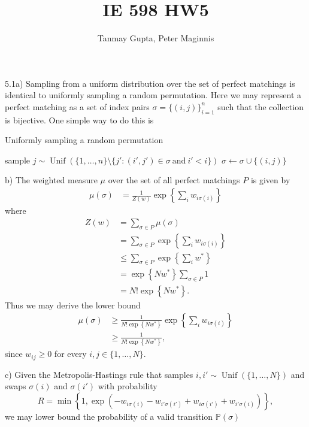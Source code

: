 \documentclass[10pt,onecolumn,letterpaper]{article}
\begin{document}
\title{IE 598 HW5}
\author{Tanmay Gupta, Peter Maginnis}
\maketitle

5.1a) Sampling from a uniform distribution over the set of perfect matchings is identical to uniformly sampling a random permutation.  Here we may represent a perfect matching as a set of index pairs $\sigma=\{(i,j)\}_{i=1}^n$ such that the collection is bijective.  One simple way to do this is
%
%
\begin{algorithm}
\raggedright
  \caption{Uniformly sampling a random permutation}
  \begin{algorithmic}
    \STATE sample $j\sim\operatorname{Unif}\left(\{1,\dotsc, n\}\setminus\{j':(i',j')\in\sigma\ \mathrm{ and }\ i'<i\}\right)$
    \STATE $\sigma\gets\sigma\cup\{(i,j)\}$
     \ENDFOR
  \end{algorithmic}
\end{algorithm}

b) The weighted measure $\mu$ over the set of all perfect matchings $P$ is given by 
\begin{align*}
   \mu(\sigma)&=\frac{1}{Z(w)}\exp\left\{\sum_i w_{i\sigma(i)}\right\}%
\end{align*}
where
\begin{align*}
  Z(w)&=\sum_{\sigma\in P}\mu(\sigma)\\
  &=\sum_{\sigma\in P}\exp\left\{\sum_i w_{i\sigma(i)}\right\}\\
  &\leq\sum_{\sigma\in P}\exp\left\{\sum_i w^*\right\}\\
  &=\exp\left\{Nw^*\right\}\sum_{\sigma\in P}1\\
  &=N!\exp\left\{Nw^*\right\}.
\end{align*}
Thus we may derive the lower bound
\begin{align*}
   \mu(\sigma)&\geq\frac{1}{N!\exp\left\{Nw^*\right\}}\exp\left\{\sum_i w_{i\sigma(i)}\right\}\\
   &\geq\frac{1}{N!\exp\left\{Nw^*\right\}},
\end{align*}
since $w_{ij}\geq0$ for every $i,j\in\{1,\dotsc,N\}$.

c) Given the Metropolis-Hastings rule that samples $i,i'\sim\operatorname{Unif}(\{1,\dotsc, N\})$ and swaps $\sigma(i)$ and $\sigma(i')$ with probability
\begin{equation*}
 R = \min\left\{1, \exp(-w_{i\sigma(i)}-w_{i'\sigma(i')}+w_{i\sigma(i')}+w_{i'\sigma(i)}) \right\},
\end{equation*}
we may lower bound the probability of a valid transition $\mathbb{P}(\sigma)$
\end{document}
